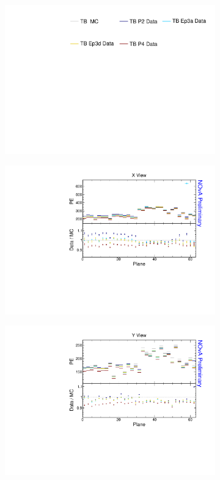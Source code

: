 \begin{figure}[!ht]
  \begin{subfigure}{\textwidth}
  \centering
    \includegraphics[height=0.2\linewidth]{essentialsec_tb/legend.pdf}
  \end{subfigure}
  \vspace*{2mm}

  \begin{subfigure}{0.5\textwidth}
    \includegraphics[width=\linewidth]{essentialsec_tb/pe_plane_x.pdf}
  \end{subfigure}
  \begin{subfigure}{0.5\textwidth}
    \includegraphics[width=\linewidth]{essentialsec_tb/pe_plane_y.pdf}

\end{subfigure}
\end{figure}
